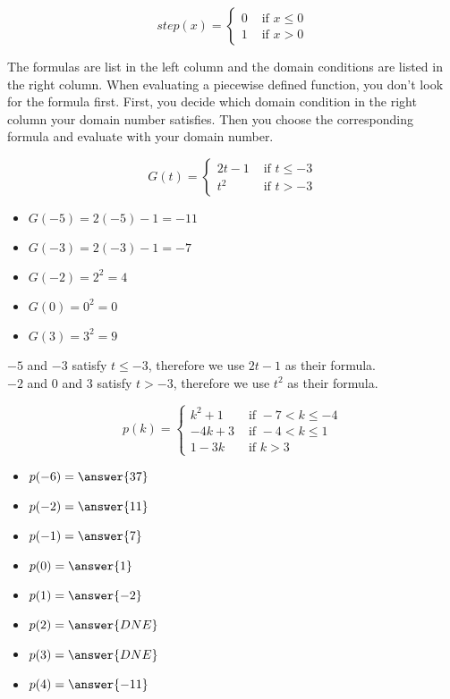 \documentclass{ximera}
\begin{document}
\[
step(x) = 
\begin{cases}
  0 & \text{ if } x \leq 0 \\
  1 & \text{ if } x > 0
\end{cases}
\]

The formulas are list in the left column and the domain conditions are listed in the right column.  When evaluating a piecewise defined function, you don't look for the formula first.  First, you decide which domain condition in the right column your domain number satisfies.  Then you choose the corresponding formula and evaluate with your domain number.



\begin{example}

\[
G(t) = 
\begin{cases}
  2t-1 & \text{ if } t \leq -3 \\
  t^2 & \text{ if } t > -3
\end{cases}
\]


\begin{itemize}
\item $G(-5) = 2(-5) - 1 = -11$  
\item $G(-3) = 2(-3) - 1 = -7$ 
\item $G(-2) = 2^2 = 4$ 
\item $G(0) = 0^2 = 0$ 
\item $G(3) = 3^2 = 9$ 
\end{itemize}


$-5$ and $-3$ satisfy $t \leq -3$, therefore we use $2t-1$ as their formula. \\
$-2$ and $0$ and $3$ satisfy $t > -3$, therefore we use $t^2$ as their formula. \\

\end{example}




\begin{question}

\[
p(k) = 
\begin{cases}
  k^2 + 1 & \text{ if } -7 < k \leq -4 \\
  -4k + 3 & \text{ if } -4 < k \leq 1 \\
  1 - 3k & \text{ if } k > 3
\end{cases}
\]


\begin{itemize}
\item $p(-6) = \answer{37}$  
\item $p(-2) = \answer{11}$ 
\item $p(-1) = \answer{7}$ 
\item $p(0) = \answer{1}$ 
\item $p(1) = \answer{-2}$ 
\item $p(2) = \answer{DNE}$ 
\item $p(3) = \answer{DNE}$ 
\item $p(4) = \answer{-11}$ 
\end{itemize}

\end{question}
\end{document}
